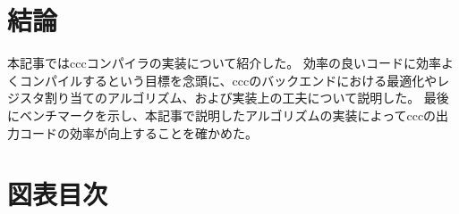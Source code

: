 \documentclass[uplatex,a4paper]{jsarticle}
\begin{document}
\section{結論}

本記事ではcccコンパイラの実装について紹介した。
効率の良いコードに効率よくコンパイルするという目標を念頭に、cccのバックエンドにおける最適化やレジスタ割り当てのアルゴリズム、および実装上の工夫について説明した。
最後にベンチマークを示し、本記事で説明したアルゴリズムの実装によってcccの出力コードの効率が向上することを確かめた。

\clearpage
\appendix

\section{図表目次}
\listoffigures
\listofalgorithms
\listoftables



\end{document}
